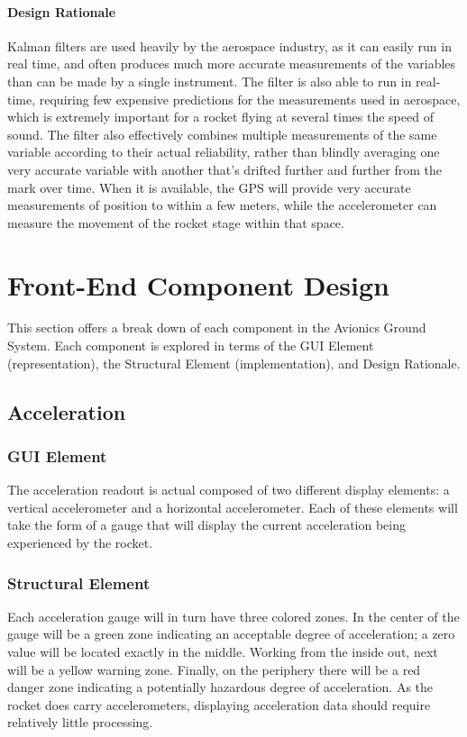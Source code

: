 \documentclass[journal,10pt,onecolumn,compsoc]{IEEEtran}
\begin{document}
			\paragraph{Design Rationale}
				\noindent Kalman filters are used heavily by the aerospace industry, as it can easily run in real time, and often produces much more accurate measurements of the variables than can be made by a single instrument.
				The filter is also able to run in real-time, requiring few expensive predictions for the measurements used in aerospace, which is extremely important for a rocket flying at several times the speed of sound.
				The filter also effectively combines multiple measurements of the same variable according to their actual reliability, rather than blindly averaging one very accurate variable with another that's drifted further and further from the mark over time.
				When it is available, the GPS will provide very accurate measurements of position to within a few meters, while the accelerometer can measure the movement of the rocket stage within that space.
				
		\setlength\parindent{24pt}

\section{Front-End Component Design}
	\noindent This section offers a break down of each component in the Avionics Ground System.
	Each component is explored in terms of the GUI Element (representation), the Structural Element (implementation), and Design Rationale.

	\subsection{Acceleration}

		\subsubsection{GUI Element}
			The acceleration readout is actual composed of two different display elements: a vertical accelerometer and a horizontal accelerometer.
			Each of these elements will take the form of a gauge that will display the current acceleration being experienced by the rocket.
			
		\subsubsection{Structural Element}
			Each acceleration gauge will in turn have three colored zones.
			In the center of the gauge will be a green zone indicating an acceptable degree of acceleration; a zero value will be located exactly in the middle.
			Working from the inside out, next will be a yellow warning zone.
			Finally, on the periphery there will be a red danger zone indicating a potentially hazardous degree of acceleration.
			As the rocket does carry accelerometers, displaying acceleration data should require relatively little processing.
\end{document}
